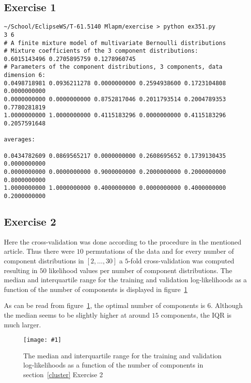 \documentclass[a4paper,oneside,article]{memoir}
\newcommand{\scalefig}[3]{
  \begin{figure}[ht!]
    \begin{adjustwidth}{-2in}{-2in}
	    \centering
	    \texttt{[image: \#1]}
	\end{adjustwidth}
	\centering
	\caption{#3}
	\label{fig:#1}
  	
  \end{figure}
}
\begin{document}
\subsection*{Exercise 1}
\begin{lstlisting}
~/School/EclipseWS/T-61.5140 Mlapm/exercise > python ex351.py 
3 6
# A finite mixture model of multivariate Bernoulli distributions
# Mixture coefficients of the 3 component distributions:
0.6015143496 0.2705895759 0.1278960745 
# Parameters of the component distributions, 3 components, data dimension 6:
0.0498718981 0.0936211278 0.0000000000 0.2594938600 0.1723104808 0.0000000000 
0.0000000000 0.0000000000 0.8752817046 0.2011793514 0.2004789353 0.7780281819 
1.0000000000 1.0000000000 0.4115183296 0.0000000000 0.4115183296 0.2057591648 

averages:

0.0434782609 0.0869565217 0.0000000000 0.2608695652 0.1739130435 0.0000000000
0.0000000000 0.0000000000 0.9000000000 0.2000000000 0.2000000000 0.8000000000
1.0000000000 1.0000000000 0.4000000000 0.0000000000 0.4000000000 0.2000000000
\end{lstlisting}

\subsection*{Exercise 2}

Here the cross-validation was done according to the procedure in the mentioned article.
Thus there were $10$ permutations of the data and for every number of component distributions in $[2,\dots,30]$ 
a $5$-fold cross-validation was computed resulting in $50$ likelihood values per number of component distributions.
The median and interquartile range for the training and validation log-likelihoods as a function of the number of
components is displayed in figure~\ref{fig:e352}

As can be read from figure~\ref{fig:e352}, the optimal number of components is $6$. Although the median seems to be
slightly higher at around $15$ components, the IQR is much larger.

\scalefig{e352}{0.9}{The median and interquartile range for the training and validation log-likelihoods as a function of the number of
components in section~\ref{cluster} Exercise 2}


%
%
\end{document}
